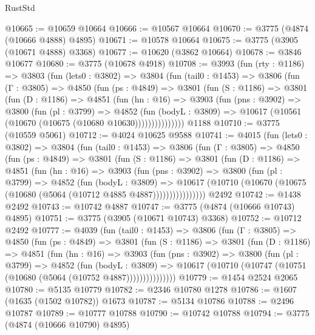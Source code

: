 \begin{lexlean}{RustStd}
\begin{coremodule}
{\begin{coremodule}
{{{{{{{{{{{{{{{{{{{{{{{{{{{{{{{@10665 := @10659 @10664
@10666 := @10567 @10664
@10670 := @3775 (@4874 (@10666 @4888) @4895)
@10671 := @10578 @10664
@10675 := @3775 (@3905 (@10671 @4888) @3368)
@10677 := @10620 (@3862 @10664)
@10678 := @3846 @10677
@10680 := @3775 (@10678 @4918)
@10708 := @3993
    (fun (rty : @1186) =>
    @3803
      (fun (lets0 : @3802) =>
      @3804
        (fun (tail0 : @1453) =>
        @3806
          (fun (Γ : @3805) =>
          @4850
            (fun (ps : @4849) =>
            @3801
              (fun (S : @1186) =>
              @3801
                (fun (D : @1186) =>
                @4851
                  (fun (hn : @16) =>
                  @3903
                    (fun (pns : @3902) =>
                    @3800
                      (fun (pl : @3799) =>
                      @4852
                        (fun (bodyL : @3809) =>
                        @10617 (@10561 (@10670 (@10675 (@10680 @10630)))))))))))))))
    @1188
@10710 := @3775 (@10559 @5061)
@10712 := @4024 @10625 @9588
@10741 := @4015
    (fun (lets0 : @3802) =>
    @3804
      (fun (tail0 : @1453) =>
      @3806
        (fun (Γ : @3805) =>
        @4850
          (fun (ps : @4849) =>
          @3801
            (fun (S : @1186) =>
            @3801
              (fun (D : @1186) =>
              @4851
                (fun (hn : @16) =>
                @3903
                  (fun (pns : @3902) =>
                  @3800
                    (fun (pl : @3799) =>
                    @4852
                      (fun (bodyL : @3809) =>
                      @10617
                        (@10710 (@10670 (@10675 (@10680 (@5064 (@10712 @4885 @4887))))))))))))))))
    @2492
@10742 := @1438 @2492
@10743 := @10742 @4887
@10747 := @3775 (@4874 (@10666 @10743) @4895)
@10751 := @3775 (@3905 (@10671 @10743) @3368)
@10752 := @10712 @2492
@10777 := @4039
    (fun (tail0 : @1453) =>
    @3806
      (fun (Γ : @3805) =>
      @4850
        (fun (ps : @4849) =>
        @3801
          (fun (S : @1186) =>
          @3801
            (fun (D : @1186) =>
            @4851
              (fun (hn : @16) =>
              @3903
                (fun (pns : @3902) =>
                @3800
                  (fun (pl : @3799) =>
                  @4852
                    (fun (bodyL : @3809) =>
                    @10617 (@10710 (@10747 (@10751 (@10680 (@5064 (@10752 @4887)))))))))))))))
@10779 := @1454 @2524 @2065
@10780 := @5135 @10779
@10782 := @2346 @10780 @1278
@10786 := @1607 (@1635 (@1502 @10782)) @1673
@10787 := @5134 @10786
@10788 := @2496 @10787
@10789 := @10777 @10788
@10790 := @10742 @10788
@10794 := @3775 (@4874 (@10666 @10790) @4895)
}}}}}}}}}}}}}}}}}}}}}}}}}}}}}}}
\end{coremodule}}
\end{coremodule}
\end{lexlean}
